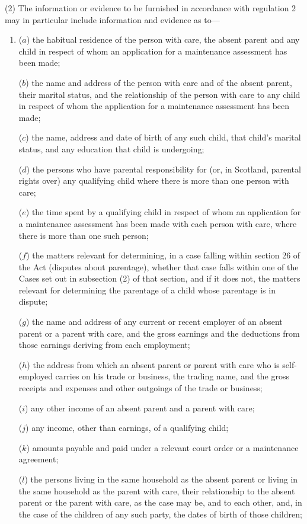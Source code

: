 \documentclass[a4paper,12pt]{article}
\begin{document}
(2) The information or evidence to be furnished in accordance with regulation 2 may in particular include information and evidence as to—
\begin{enumerate}\item[]
($a$) the habitual residence of the person with care, the absent parent and any child in respect of whom an application for a maintenance assessment has been made;

($b$) the name and address of the person with care and of the absent parent, their marital status, and the relationship of the person with care to any child in respect of whom the application for a maintenance assessment has been made;

($c$) the name, address and date of birth of any such child, that child’s marital status, and any education that child is undergoing;

($d$) the persons who have parental responsibility for (or, in Scotland, parental rights over) any qualifying child where there is more than one person with care;

($e$) the time spent by a qualifying child in respect of whom an application for a maintenance assessment has been made with each person with care, where there is more than one such person;

($f$) the matters relevant for determining, in a case falling within section 26 of the Act (disputes about parentage), whether that case falls within one of the Cases set out in subsection (2) of that section, and if it does not, the matters relevant for determining the parentage of a child whose parentage is in dispute;

($g$) the name and address of any current or recent employer of an absent parent or a parent with care, and the gross earnings and the deductions from those earnings deriving from each employment;

($h$) the address from which an absent parent or parent with care who is self-employed carries on his trade or business, the trading name, and the gross receipts and expenses and other outgoings of the trade or business;

($i$) any other income of an absent parent and a parent with care;

($j$) any income, other than earnings, of a qualifying child;

($k$) amounts payable and paid under a relevant court order or a maintenance agreement;

($l$) the persons living in the same household as the absent parent or living in the same household as the parent with care, their relationship to the absent parent or the parent with care, as the case may be, and to each other, and, in the case of the children of any such party, the dates of birth of those children;


\end{enumerate}
\end{document}
